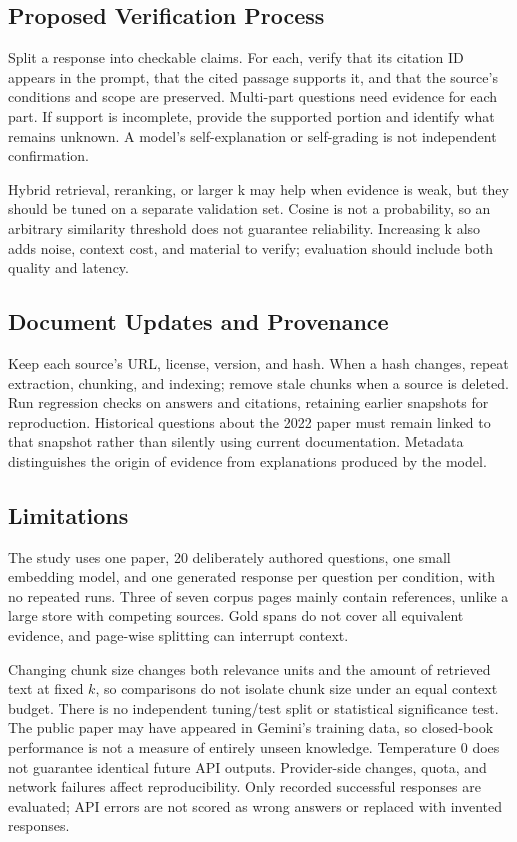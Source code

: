 \documentclass[12pt,a4paper]{article}
\begin{document}
\subsection*{Proposed Verification Process}
Split a response into checkable claims. For each, verify that its citation ID appears in the prompt, that the cited passage supports it, and that the source's conditions and scope are preserved. Multi-part questions need evidence for each part. If support is incomplete, provide the supported portion and identify what remains unknown. A model's self-explanation or self-grading is not independent confirmation.

Hybrid retrieval, reranking, or larger k may help when evidence is weak, but they should be tuned on a separate validation set. Cosine is not a probability, so an arbitrary similarity threshold does not guarantee reliability. Increasing k also adds noise, context cost, and material to verify; evaluation should include both quality and latency.

\subsection*{Document Updates and Provenance}
Keep each source's URL, license, version, and hash. When a hash changes, repeat extraction, chunking, and indexing; remove stale chunks when a source is deleted. Run regression checks on answers and citations, retaining earlier snapshots for reproduction. Historical questions about the 2022 paper must remain linked to that snapshot rather than silently using current documentation. Metadata distinguishes the origin of evidence from explanations produced by the model.

\subsection*{Limitations}
The study uses one paper, 20 deliberately authored questions, one small embedding model, and one generated response per question per condition, with no repeated runs. Three of seven corpus pages mainly contain references, unlike a large store with competing sources. Gold spans do not cover all equivalent evidence, and page-wise splitting can interrupt context.

Changing chunk size changes both relevance units and the amount of retrieved text at fixed $k$, so comparisons do not isolate chunk size under an equal context budget. There is no independent tuning/test split or statistical significance test. The public paper may have appeared in Gemini's training data, so closed-book performance is not a measure of entirely unseen knowledge. Temperature 0 does not guarantee identical future API outputs. Provider-side changes, quota, and network failures affect reproducibility. Only recorded successful responses are evaluated; API errors are not scored as wrong answers or replaced with invented responses.
\end{document}
